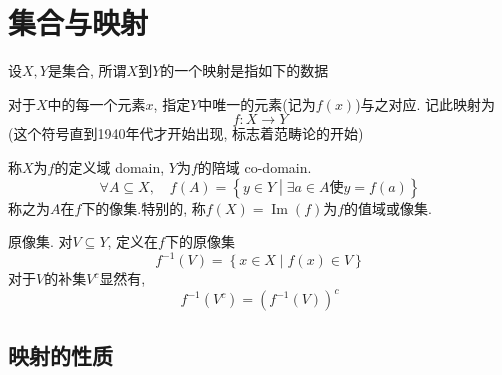 \section{集合与映射}
\begin{definition}
    设$X, Y$是集合, 所谓$X$到$Y$的一个映射是指如下的数据
    
    对于$X$中的每一个元素$x$, 指定$Y$中唯一的元素(记为$f(x)$)与之对应.
    记此映射为
    \begin{equation}
      f \colon X \rightarrow Y
    \end{equation}
    (这个符号直到1940年代才开始出现, 标志着范畴论的开始)

    称$X$为$f$的定义域 domain, $Y$为$f$的陪域 co-domain.
    \begin{equation}
      \forall A \subseteq X, \quad f(A) = \left\{ y \in Y \middle|\exists a \in A \text{使} y= f(a) \right\} 
    \end{equation}
    称之为$A$在$f$下的像集.特别的, 称$f(X) = \operatorname{Im}(f)$为$f$的值域或像集.
\end{definition}

\begin{definition}
    原像集. 对$V \subseteq Y$, 定义在$f$下的原像集
    \begin{equation}
        f^{-1}(V) = \left\{ x \in X \middle| f(x) \in V \right\}
    \end{equation}
    对于$V$的补集$V^c$显然有,
    \begin{equation}
      f^{-1}(V^c) = \left( f^{-1}(V) \right) ^c
    \end{equation}

\end{definition}


\subsection{映射的性质}

